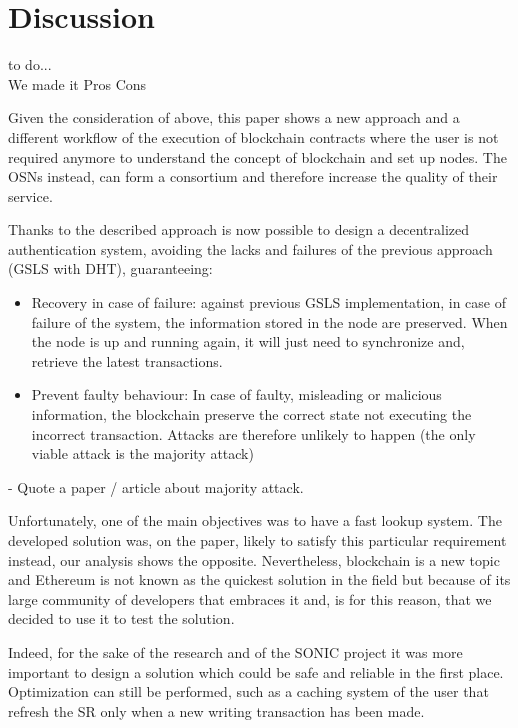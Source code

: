 \section{Discussion}
\label{S:6}

\begin{notation}
    to do... \\
    We made it
    Pros
    Cons
\end{notation}

Given the consideration of above, this paper shows a new approach and a different workflow of the execution of blockchain contracts where the user is not required anymore to understand the concept of blockchain and set up nodes.
The OSNs instead, can form a consortium and therefore increase the quality of their service.

Thanks to the described approach is now possible to design a decentralized authentication system, avoiding the lacks and failures of the previous approach (GSLS with DHT), guaranteeing:

\begin{itemize}
    \item{Recovery in case of failure:} against previous GSLS implementation, in case of failure of the system, the information stored in the node are preserved. When the node is up and running again, it will just need to synchronize and, retrieve the latest transactions.
    \item{Prevent faulty behaviour:} In case of faulty, misleading or malicious information, the blockchain preserve the correct state not executing the incorrect transaction. Attacks are therefore unlikely to happen (the only viable attack is the majority attack)
\end{itemize}

\begin{notation}
    - Quote a paper / article about majority attack.
\end{notation}

Unfortunately, one of the main objectives was to have a fast lookup system.
The developed solution was, on the paper, likely to satisfy this particular requirement instead, our analysis shows the opposite. 
Nevertheless, blockchain is a new topic and Ethereum is not known as the quickest solution in the field but because of its large community of developers that embraces it and, is for this reason, that we decided to use it to test the solution.

Indeed, for the sake of the research and of the SONIC project it was more important to design a solution which could be safe and reliable in the first place. Optimization can still be performed, such as a caching system of the user that refresh the SR only when a new writing transaction has been made.






